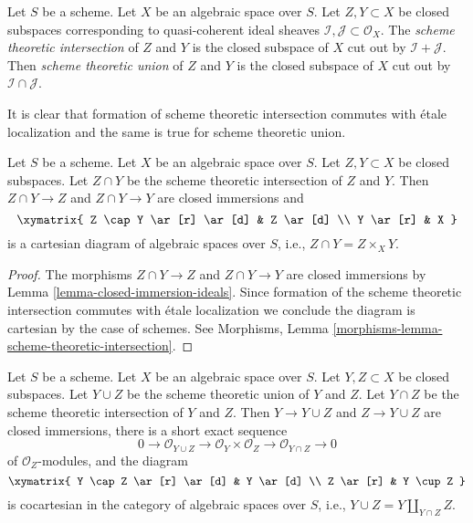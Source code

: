 \begin{definition}
\label{definition-scheme-theoretic-intersection-union}
Let $S$ be a scheme. Let $X$ be an algebraic space over $S$.
Let $Z, Y \subset X$ be closed subspaces
corresponding to quasi-coherent ideal sheaves
$\mathcal{I}, \mathcal{J} \subset \mathcal{O}_X$.
The {\it scheme theoretic intersection} of $Z$ and $Y$
is the closed subspace of $X$ cut out by $\mathcal{I} + \mathcal{J}$.
Then {\it scheme theoretic union} of $Z$ and $Y$
is the closed subspace of $X$ cut out by
$\mathcal{I} \cap \mathcal{J}$.
\end{definition}

\noindent
It is clear that formation of scheme theoretic intersection
commutes with \'etale localization and the same is true for
scheme theoretic union.

\begin{lemma}
\label{lemma-scheme-theoretic-intersection}
Let $S$ be a scheme. Let $X$ be an algebraic space over $S$.
Let $Z, Y \subset X$ be closed subspaces.
Let $Z \cap Y$ be the scheme theoretic intersection of $Z$ and $Y$.
Then $Z \cap Y \to Z$ and $Z \cap Y \to Y$ are closed immersions
and
$$
\xymatrix{
Z \cap Y \ar[r] \ar[d] & Z \ar[d] \\
Y \ar[r] & X
}
$$
is a cartesian diagram of algebraic spaces over $S$, i.e.,
$Z \cap Y = Z \times_X Y$.
\end{lemma}

\begin{proof}
The morphisms $Z \cap Y \to Z$ and $Z \cap Y \to Y$ are closed immersions
by Lemma \ref{lemma-closed-immersion-ideals}.
Since formation of the scheme theoretic intersection commutes
with \'etale localization we conclude the diagram is cartesian
by the case of schemes. See
Morphisms, Lemma \ref{morphisms-lemma-scheme-theoretic-intersection}.
\end{proof}

\begin{lemma}
\label{lemma-scheme-theoretic-union}
Let $S$ be a scheme. Let $X$ be an algebraic space over $S$.
Let $Y, Z \subset X$ be closed subspaces.
Let $Y \cup Z$ be the scheme theoretic union of $Y$ and $Z$.
Let $Y \cap Z$ be the scheme theoretic intersection of $Y$ and $Z$.
Then $Y \to Y \cup Z$ and $Z \to Y \cup Z$ are closed immersions,
there is a short exact sequence
$$
0 \to \mathcal{O}_{Y \cup Z} \to \mathcal{O}_Y \times \mathcal{O}_Z
\to \mathcal{O}_{Y \cap Z} \to 0
$$
of $\mathcal{O}_Z$-modules, and the diagram
$$
\xymatrix{
Y \cap Z \ar[r] \ar[d] & Y \ar[d] \\
Z \ar[r] & Y \cup Z
}
$$
is cocartesian in the category of algebraic spaces over $S$, i.e.,
$Y \cup Z = Y \amalg_{Y \cap Z} Z$.
\end{lemma}

